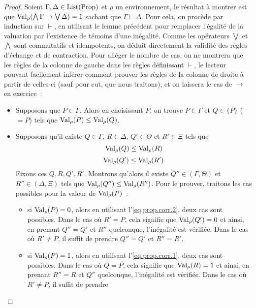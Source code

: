 \begin{proof}
  Soient $\Gamma,\Delta\in\operatorname{List}(\operatorname{Prop})$ et $\rho$ un environnement, le résultat
  à montrer est que $\operatorname{Val}_\rho(\bigwedge\Gamma\to\bigvee\Delta) = 1$ sachant que
  $\Gamma\vdash \Delta$. Pour cela, on procède par induction sur $\vdash$,
  en utilisant le lemme précédent pour remplacer l'égalité de la valuation par
  l'existence de témoins d'une inégalité. Comme les opérateurs $\bigvee$ et
  $\bigwedge$ sont commutatifs et idempotents, on déduit directement la validité
  des règles d'échange et de contraction. Pour alléger le nombre de cas, on ne
  montrera que les règles de la colonne de gauche dans les règles définissant
  $\vdash$, le lecteur pouvant facilement inférer comment prouver les règles
  de la colonne de droite à partir de celles-ci (sauf pour cut, que nous
  traitons), et on laissera le cas de $\to$ en exercice~:
  \begin{itemize}
  \item Supposons que $P\in\Gamma$. Alors en choisissant $P$, on trouve
    $P\in\Gamma$ et $Q\in\{P\}$ ($=P$) tels que $\operatorname{Val}_\rho(P) \leq\operatorname{Val}_\rho(Q)$.
  \item Supposons qu'il existe $Q\in\Gamma$, $R\in\Delta$, $Q'\in\Theta$ et
    $R'\in\Xi$ tels que
    \begin{equation}\label{eq.prop.corr.1}
      \operatorname{Val}_\rho(Q)\leq\operatorname{Val}_\rho(R)
    \end{equation}
    \begin{equation}\label{eq.prop.corr.2}
      \operatorname{Val}_\rho(Q')\leq\operatorname{Val}_\rho(R')
    \end{equation}
    Fixons ces $Q,R,Q',R'$. Montrons qu'alors il existe $Q''\in(\Gamma,\Theta)$
    et $R''\in(\Delta,\Xi)$ tels que $\operatorname{Val}_\rho(Q'')\leq\operatorname{Val}_\rho(R'')$. Pour le
    prouver, traitons les cas possibles pour la valeur de $\operatorname{Val}_\rho(P)$~:
    \begin{itemize}
    \item si $\operatorname{Val}_\rho(P) = 0$, alors en utilisant l'\cref{eq.prop.corr.2},
      deux cas sont possibles. Dans le cas où $R' = P$, cela signifie que
      $\operatorname{Val}_\rho(Q') = 0$ et ainsi, en prenant $Q'' = Q'$ et $R''$ quelconque,
      l'inégalité est vérifiée. Dans le cas où $R' \neq P$, il suffit de prendre
      $Q'' = Q'$ et $R'' = R'$.
    \item si $\operatorname{Val}_\rho(P) = 1$, alors en utilisant l'\cref{eq.prop.corr.1},
      deux cas sont possibles. Dans le cas où $Q = P$, cela signifie que
      $\operatorname{Val}_\rho(R) = 1$ et ainsi, en prenant $R'' = R$ et $Q''$ quelconque,
      l'inégalité est vérifiée. Dans le cas où $R'\neq P$, il suffit de prendre

\end{itemize}
\end{itemize}
\end{proof}
